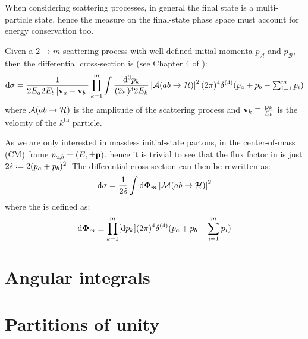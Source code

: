 When considering scattering processes, in general the final state is a multi-particle state, hence the measure on the final-state phase space must account for energy conservation too.

Given a $ 2 \rightarrow m $ scattering process with well-defined initial momenta $ p_\mathcal{A} $ and $ p_\mathcal{B} $, then the differential cross-section is (see Chapter 4 of \cite{Peskin-1995}):
\begin{equation}
  \mathrm{d}\sigma = \frac{1}{2E_a 2E_b \left\lvert\mathbf{v}_a - \mathbf{v}_b\right\rvert} \prod_{k = 1}^m \int \frac{\mathrm{d}^3p_k}{(2\pi)^3 2E_k} \left\lvert\mathcal{A}(ab \rightarrow \mathcal{H})\right\rvert^2 (2\pi)^4 \delta^{(4)}(p_a + p_b - \textstyle\sum_{i = 1}^m p_i)
  \label{eq:scatt-cr-sec}
\end{equation}
where $ \mathcal{A}(ab \rightarrow \mathcal{H}) $ is the amplitude of the scattering process and $ \mathbf{v}_k \equiv \frac{\mathbf{p}_k}{E_k} $ is the velocity of the $ k^\text{th} $ particle.

As we are only interested in massless initial-state partons, in the center-of-mass (CM) frame $ p_{a,b} = (E, \pm\mathbf{p}) $, hence it is trivial to see that the flux factor in  is just $ 2\hat{s} \defeq 2 (p_a + p_b)^2 $. The differential cross-section can then be rewritten as:
\begin{equation}
  \mathrm{d} \sigma = \frac{1}{2\hat{s}} \int \mathrm{d} \boldsymbol{\Phi}_m \left\lvert\mathcal{M}(ab \rightarrow \mathcal{H})\right\rvert^2
\end{equation}
where the  is defined as:
\begin{equation}
  \mathrm{d} \boldsymbol{\Phi}_m \equiv \prod_{k = 1}^m [\mathrm{d} p_k] (2\pi)^4 \delta^{(4)}(p_a + p_b - \sum_{i = 1}^m p_i)
\end{equation}

\section{Angular integrals}

\section{Partitions of unity}
\label{sec:unit-part}

